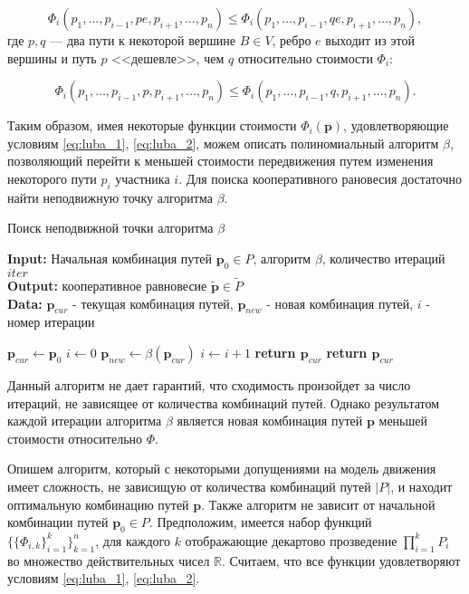 \documentclass[12pt, a4paper]{article}
\begin{document}
\begin{equation}
	\label{eq:luba_1}
	\Phi_i (p_1, \ldots, p_{i - 1}, pe, p_{i + 1}, \ldots, p_n) \le 
	\Phi_i (p_1, \ldots, p_{i - 1}, qe, p_{i + 1}, \ldots, p_n),
\end{equation}
где $p, q$ --- два пути к некоторой вершине $B \in V$, ребро $e$ выходит из этой вершины и путь $p$ <<дешевле>>, чем $q$ относительно стоимости $\Phi_i$:

\begin{equation}
	\label{eq:luba_2}
	\Phi_i (p_1, \ldots, p_{i - 1}, p, p_{i + 1}, \ldots, p_n) \le
  	\Phi_i (p_1, \ldots, p_{i - 1}, q, p_{i + 1}, \ldots, p_n).
\end{equation}

Таким образом, имея некоторые функции стоимости $\Phi_i (\textbf{p})$, удовлетворяющие условиям \eqref{eq:luba_1}, \eqref{eq:luba_2}, можем описать полиномиальный алгоритм $\beta$, позволяющий перейти к меньшей стоимости передвижения путем изменения некоторого пути  $p_i$ участника $i$. Для поиска кооперативного рановесия достаточно найти неподвижную точку алгоритма $\beta$. 

\begin{algorithm}[H]
	\caption{Поиск неподвижной точки алгоритма $\beta$}
	\label{alg:coop_find1}
	{\bf {Input:}} Начальная комбинация путей $\textbf{p}_0 \in P$, алгоритм $\beta$, количество итераций $iter$\\
	{\bf {Output:}} кооперативное равновесие $\widetilde{\textbf{p}} \in \widetilde{P}$\\
	{\bf {Data:}} $\textbf{p}_{cur}$ - текущая комбинация путей, $\textbf{p}_{new}$ - новая комбинация путей, $i$ - номер итерации
	\begin{algorithmic}[1]
		\State $\textbf{p}_{cur} \gets \textbf{p}_0$
		\State $i \gets 0$
		\State $\textbf{p}_{new} \gets \beta (\textbf{p}_{cur}) $
		\State $i \gets i + 1$
			\State \textbf{return $\textbf{p}_{cur}$}
		\EndIf
		\EndWhile
	\State \textbf{return $\textbf{p}_{cur}$}
	\end{algorithmic}
\end{algorithm}

Данный алгоритм не дает гарантий, что сходимость произойдет за число итераций, не зависящее от количества комбинаций путей. Однако результатом каждой итерации алгоритма $\beta$ является новая комбинация путей $\textbf{p}$ меньшей стоимости относительно $\Phi$. 

Опишем алгоритм, который с некоторыми допущениями на модель движения имеет сложность, не зависищую от количества комбинаций путей $|P|$, и находит оптимальную комбинацию путей $\textbf{p}$.
Также алгоритм не зависит от начальной комбинации путей $\textbf{p}_0 \in P$. Предположим, имеется набор функций $\{\{\Phi_{i, k} \}_{i = 1}^k\}_{k = 1}^n$, для каждого $k$ отображающие декартово прозведение $\prod\limits_{i = 1}^kP_i$ во множество действительных чисел $\mathbb{R}$. Считаем, что все функции удовлетворяют условиям \eqref{eq:luba_1}, \eqref{eq:luba_2}.
\end{document}
